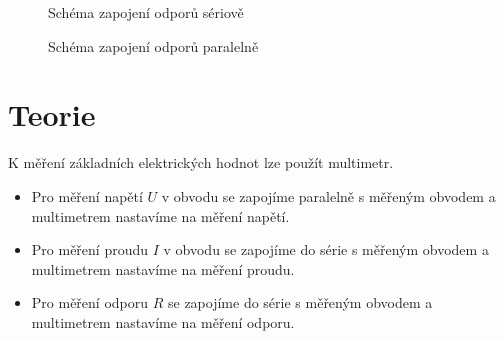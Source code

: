 \documentclass[11pt,a4paper,titlepage]{article}
\begin{document}
\begin{figure}[ht]
\begin{center}
    \caption{Schéma zapojení odporů sériově}
    \label{pic:obvod1}
\end{center}
\end{figure}

\begin{figure}[ht]
\begin{center}
    \caption{Schéma zapojení odporů paralelně}
    \label{pic:obvod2}
\end{center}
\end{figure}


\section{Teorie}

K měření základních elektrických hodnot lze použít multimetr. 

\begin{itemize}
  \item Pro měření napětí $U$ v obvodu se zapojíme paralelně s měřeným obvodem a multimetrem nastavíme na měření napětí.
  \item Pro měření proudu $I$ v obvodu se zapojíme do série s měřeným obvodem a multimetrem nastavíme na měření proudu. 
  \item Pro měření odporu $R$ se zapojíme do série s měřeným obvodem a multimetrem nastavíme na měření odporu.
\end{itemize}
\end{document}
